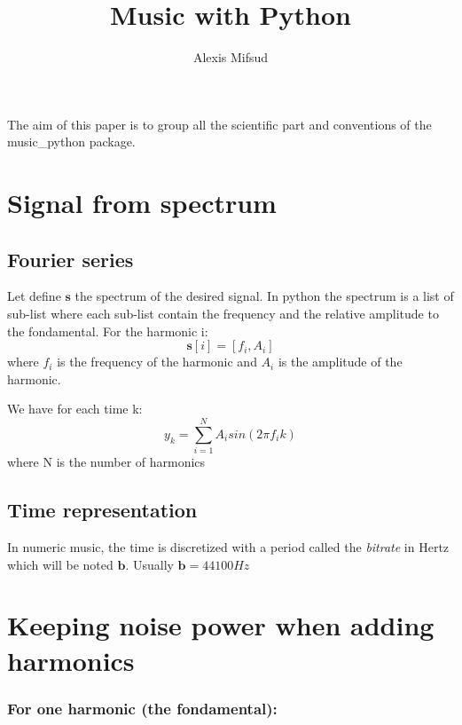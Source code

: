 \documentclass{article}
\title{Music with Python}
\author{Alexis Mifsud}
\begin{document}
\maketitle

The aim of this paper is to group all the scientific part and conventions of the music\_python package.

\tableofcontents


\section{Signal from spectrum}
\renewcommand\vec[1]{\mathbf{#1}}
\newcommand\s{\vec{s}}
\newcommand\br{\vec{b}}
\newcommand\p{\vec{p}}

\subsection{Fourier series}

Let define $\s$ the spectrum of the desired signal. In python the spectrum is a list of sub-list where each sub-list contain the frequency and the relative amplitude to the fondamental. For the harmonic i:
\begin{equation}
\s[i]=[f_i,A_i]
\end{equation}
where $f_i$ is the frequency of the harmonic and $A_i$ is the amplitude of the harmonic.

We have for each time k:
\begin{equation}
y_k=\sum_{i=1}^{N} A_i sin(2 \pi f_i k)
\end{equation}
where N is the number of harmonics

\subsection{Time representation}

In numeric music, the time is discretized with a period called the \textit{bitrate} in Hertz which will be noted $\br$. Usually $\br=44100 Hz$

\section{Keeping noise power when adding harmonics}

\subsubsection*{For one harmonic (the fondamental):}
\end{document}
